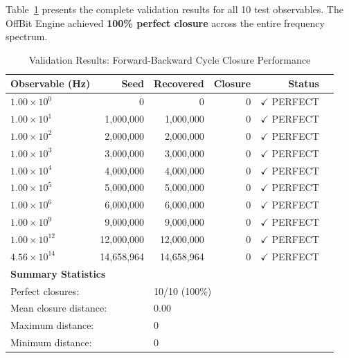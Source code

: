 \documentclass[11pt,letterpaper]{article}
\begin{document}
Table~\ref{tab:validation_results} presents the complete validation results for all 10 test observables. The OffBit Engine achieved \textbf{100\% perfect closure} across the entire frequency spectrum.

\begin{table}[H]
\centering
\caption{Validation Results: Forward-Backward Cycle Closure Performance}
\label{tab:validation_results}
\small
\begin{tabular}{@{}lrrrrl@{}}
\toprule
\textbf{Observable (Hz)} & \textbf{Seed} & \textbf{Recovered} & \textbf{Closure} & \textbf{Status} \\
\midrule
$1.00 \times 10^{0}$  & 0          & 0          & 0 & \textcolor{green!60!black}{$\checkmark$ PERFECT} \\
$1.00 \times 10^{1}$  & 1,000,000  & 1,000,000  & 0 & \textcolor{green!60!black}{$\checkmark$ PERFECT} \\
$1.00 \times 10^{2}$  & 2,000,000  & 2,000,000  & 0 & \textcolor{green!60!black}{$\checkmark$ PERFECT} \\
$1.00 \times 10^{3}$  & 3,000,000  & 3,000,000  & 0 & \textcolor{green!60!black}{$\checkmark$ PERFECT} \\
$1.00 \times 10^{4}$  & 4,000,000  & 4,000,000  & 0 & \textcolor{green!60!black}{$\checkmark$ PERFECT} \\
$1.00 \times 10^{5}$  & 5,000,000  & 5,000,000  & 0 & \textcolor{green!60!black}{$\checkmark$ PERFECT} \\
$1.00 \times 10^{6}$  & 6,000,000  & 6,000,000  & 0 & \textcolor{green!60!black}{$\checkmark$ PERFECT} \\
$1.00 \times 10^{9}$  & 9,000,000  & 9,000,000  & 0 & \textcolor{green!60!black}{$\checkmark$ PERFECT} \\
$1.00 \times 10^{12}$ & 12,000,000 & 12,000,000 & 0 & \textcolor{green!60!black}{$\checkmark$ PERFECT} \\
$4.56 \times 10^{14}$ & 14,658,964 & 14,658,964 & 0 & \textcolor{green!60!black}{$\checkmark$ PERFECT} \\
\midrule
\multicolumn{5}{l}{\textbf{Summary Statistics}} \\
\midrule
\multicolumn{2}{l}{Perfect closures:} & \multicolumn{3}{l}{10/10 (100\%)} \\
\multicolumn{2}{l}{Mean closure distance:} & \multicolumn{3}{l}{0.00} \\
\multicolumn{2}{l}{Maximum distance:} & \multicolumn{3}{l}{0} \\
\multicolumn{2}{l}{Minimum distance:} & \multicolumn{3}{l}{0} \\
\bottomrule
\end{tabular}
\end{table}
\end{document}
